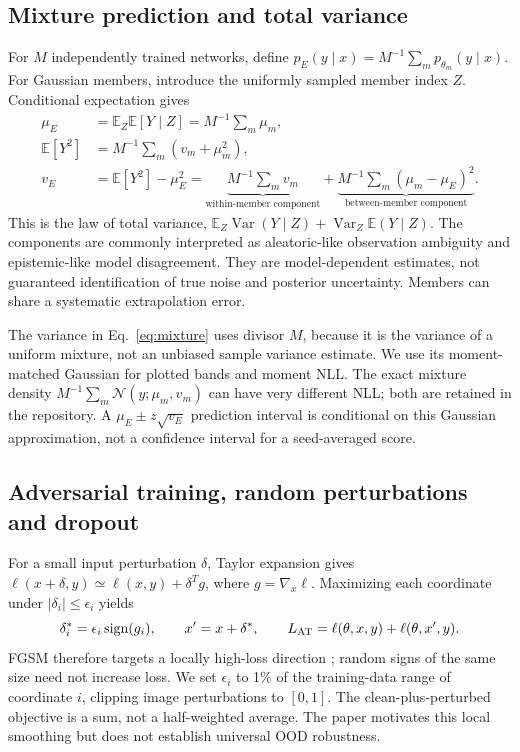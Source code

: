 \documentclass[11pt,a4paper]{article}
\newcommand{\E}{\mathbb{E}}
\begin{document}
\subsection{Mixture prediction and total variance}
For $M$ independently trained networks, define $p_E(y\mid x)=M^{-1}\sum_m p_{\theta_m}(y\mid x)$. For Gaussian members, introduce the uniformly sampled member index $Z$. Conditional expectation gives
\begin{align}
\mu_E&=\E_Z\E[Y\mid Z]=M^{-1}\sum_m\mu_m,\\
\E[Y^2]&=M^{-1}\sum_m(v_m+\mu_m^2),\\
v_E&=\E[Y^2]-\mu_E^2
=\underbrace{M^{-1}\sum_m v_m}_{\text{within-member component}}
+\underbrace{M^{-1}\sum_m(\mu_m-\mu_E)^2}_{\text{between-member component}}.\label{eq:mixture}
\end{align}
This is the law of total variance, $\E_Z\operatorname{Var}(Y\mid Z)+\operatorname{Var}_Z\E(Y\mid Z)$. The components are commonly interpreted as aleatoric-like observation ambiguity and epistemic-like model disagreement. They are model-dependent estimates, not guaranteed identification of true noise and posterior uncertainty. Members can share a systematic extrapolation error.

The variance in Eq.~\eqref{eq:mixture} uses divisor $M$, because it is the variance of a uniform mixture, not an unbiased sample variance estimate. We use its moment-matched Gaussian for plotted bands and moment NLL. The exact mixture density $M^{-1}\sum_m\mathcal N(y;\mu_m,v_m)$ can have very different NLL; both are retained in the repository. A $\mu_E\pm z\sqrt{v_E}$ prediction interval is conditional on this Gaussian approximation, not a confidence interval for a seed-averaged score.

\subsection{Adversarial training, random perturbations and dropout}
For a small input perturbation $\delta$, Taylor expansion gives $\ell(x+\delta,y)\simeq\ell(x,y)+\delta^Tg$, where $g=\nabla_x\ell$. Maximizing each coordinate under $|\delta_i|\leq\epsilon_i$ yields
\begin{equation}
\delta_i^*=\epsilon_i\operatorname{sign}(g_i),\qquad
x'=x+\delta^*,\qquad L_{\rm AT}=\ell(\theta,x,y)+\ell(\theta,x',y).\label{eq:fgsm}
\end{equation}
FGSM therefore targets a locally high-loss direction \citep{goodfellow2015explaining}; random signs of the same size need not increase loss. We set $\epsilon_i$ to 1\% of the training-data range of coordinate $i$, clipping image perturbations to $[0,1]$. The clean-plus-perturbed objective is a sum, not a half-weighted average. The paper motivates this local smoothing but does not establish universal OOD robustness.
\end{document}
